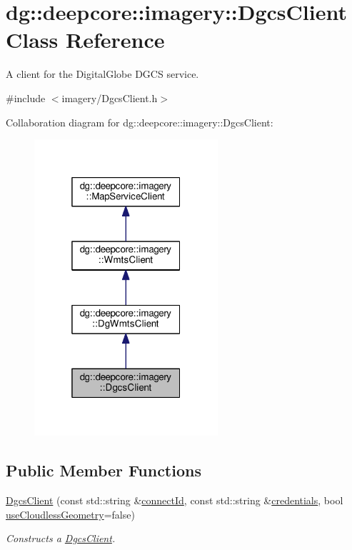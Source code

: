 \hypertarget{structdg_1_1deepcore_1_1imagery_1_1_dgcs_client}{}\section{dg\+:\+:deepcore\+:\+:imagery\+:\+:Dgcs\+Client Class Reference}
\label{structdg_1_1deepcore_1_1imagery_1_1_dgcs_client}


A client for the Digital\+Globe D\+G\+CS service.  




{\ttfamily \#include $<$imagery/\+Dgcs\+Client.\+h$>$}



Collaboration diagram for dg\+:\+:deepcore\+:\+:imagery\+:\+:Dgcs\+Client\+:
\nopagebreak
\begin{figure}[H]
\begin{center}
\leavevmode
\includegraphics[width=193pt]{structdg_1_1deepcore_1_1imagery_1_1_dgcs_client__coll__graph}
\end{center}
\end{figure}
\subsection*{Public Member Functions}
\begin{DoxyCompactItemize}
\item 
\hyperlink{structdg_1_1deepcore_1_1imagery_1_1_dgcs_client_a0058760594e9e52b23a5b9cad79a06a3}{Dgcs\+Client} (const std\+::string \&\hyperlink{classdg_1_1deepcore_1_1imagery_1_1_dg_wmts_client_aaa23928355c68c5422a5aab297d64f99}{connect\+Id}, const std\+::string \&\hyperlink{group___imagery_module_gac4c03ea635c336ca2fe7de533706c11c}{credentials}, bool \hyperlink{classdg_1_1deepcore_1_1imagery_1_1_dg_wmts_client_a718ef987832eb1d5bbab510c6ef7b70c}{use\+Cloudless\+Geometry}=false)
\begin{DoxyCompactList}\small\item\em Constructs a \hyperlink{structdg_1_1deepcore_1_1imagery_1_1_dgcs_client}{Dgcs\+Client}. \end{DoxyCompactList}\end{DoxyCompactItemize}
